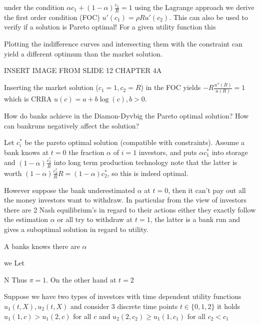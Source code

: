 under the condition \( \alpha c_1 + (1 - \alpha) \frac{c_2}{R} = 1 \)
using the Lagrange approach we derive the first order condition (FOC)
\( u'(c_1) = \rho R u'(c_2) \). This can also be used to verify if a solution is Pareto optimal!
For a given utility function this 

Plotting the indifference curves and intersecting them with the constraint
can yield a different optimum than the market solution.

INSERT IMAGE FROM SLIDE 12 CHAPTER 4A

Inserting the market solution (\(c_1 = 1, c_2 = R\)) in the FOC yields
\( -R \frac{u''(R)}{u(R)} = 1 \) which is CRRA \( u(c) = a + b\log(c), b > 0 \).


How do banks achieve in the Diamon-Dyvbig the Pareto optimal solution?
How can bankruns negatively affect the solution?


Let \( c_i^\ast \) be the pareto optimal solution (compatible with constraints).
Assume a bank knows at \( t = 0 \) the fraction \( \alpha \) of \( i = 1 \) investors,
and puts \( \alpha c_1^\ast \) into storage and \( (1 - \alpha) \frac{c_2^\ast}{R} \) into long term production technology
note that the latter is worth \( (1 - \alpha) \frac{c_2^\ast}{R}R = (1 - \alpha)c_2^\ast \), so this is indeed optimal.

However suppose the bank underestimated \( \alpha \) at \( t = 0 \), then it can't pay out all the money investors want
to withdraw. In particular from the view of investors there are 2 Nash equilibrium's in regard to their actions
either they exactly follow the estimation \( \alpha \) or all try to withdraw at \( t = 1 \), the latter is a bank run
and gives a suboptimal solution in regard to utility.



A banks knows there are \( \alpha \)



we 
Let 

N
Thus \( \pi = 1 \).
On the other hand at \( t = 2 \)




Suppose we have two types of investors with time dependent utility functions
\( u_1(t, X), u_2(t, X) \) and consider 3 discrete time points \( t \in \{0, 1, 2\} \)
it holds \( u_1(1, c) > u_1(2, c) \) for all \( c \) and \( u_2(2, c_2) \geq u_1(1, c_1) \)
for all \( c_2 < c_1 \)
